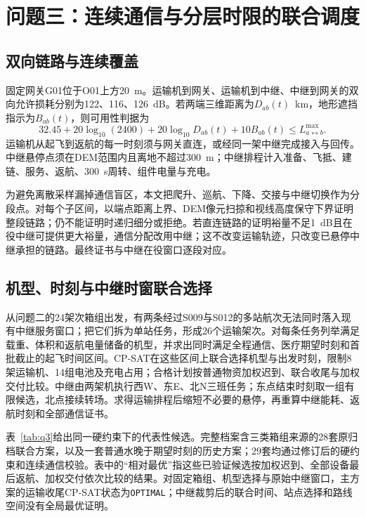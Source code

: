 \section{问题三：连续通信与分层时限的联合调度}

\subsection{双向链路与连续覆盖}

固定网关G01位于O01上方20~m。运输机到网关、运输机到中继、中继到网关的双向允许损耗分别为122、116、126~dB。若两端三维距离为$D_{ab}(t)$~km，地形遮挡指示为$B_{ab}(t)$，则可用性判据为
\begin{equation}
32.45+20\log_{10}(2400)+20\log_{10}D_{ab}(t)+10B_{ab}(t)
\le L^{\max}_{a\leftrightarrow b}.
\end{equation}
运输机从起飞到返航的每一时刻须与网关直连，或经同一架中继完成接入与回传。中继悬停点须在DEM范围内且离地不超过300~m；中继排程计入准备、飞抵、建链、服务、返航、300~s周转、组件电量与充电。

为避免离散采样漏掉通信盲区，本文把爬升、巡航、下降、交接与中继切换作为分段点。对每个子区间，以端点距离上界、DEM像元扫掠和视线高度保守下界证明整段链路；仍不能证明时递归细分或拒绝。若直连链路的证明裕量不足1~dB且在役中继可提供更大裕量，通信分配改用中继；这不改变运输轨迹，只改变已悬停中继承担的链路。最终证书与中继在役窗口逐段对应。

\subsection{机型、时刻与中继时窗联合选择}

从问题二的24架次箱组出发，有两条经过S009与S012的多站航次无法同时落入现有中继服务窗口；把它们拆为单站任务，形成26个运输架次。对每条任务列举满足载重、体积和返航电量储备的机型，并求出同时满足全程通信、医疗期望时刻和首批截止的起飞时间区间。CP-SAT在这些区间上联合选择机型与出发时刻，限制8架运输机、14组电池及充电占用；合格计划按普通物资加权迟到、联合收尾与加权交付比较。中继由两架机执行西W、东E、北N三班任务；东点结束时刻取一组有限候选，北点接续转场。求得运输排程后缩短不必要的悬停，再重算中继能耗、返航时刻和全部通信证书。

表~\ref{tab:q3}给出同一硬约束下的代表性候选。完整档案含三类箱组来源的28套原归档联合方案，以及一套普通水晚于期望时刻的历史方案；29套均通过修订后的硬约束和连续通信校验。表中的“相对最优”指这些已验证候选按加权迟到、全部设备最后返航、加权交付依次比较的结果。对固定箱组、机型选择与原始中继窗口，主方案的运输收尾CP-SAT状态为\texttt{OPTIMAL}；中继裁剪后的联合时间、站点选择和路线空间没有全局最优证明。

